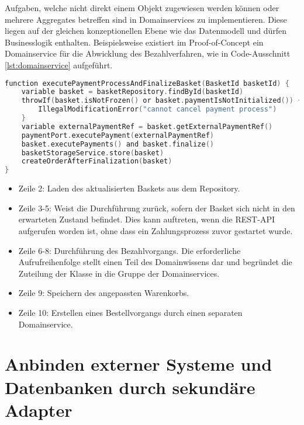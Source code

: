 Aufgaben, welche nicht direkt einem Objekt zugewiesen werden können oder mehrere Aggregates betreffen sind in Domainservices zu implementieren. Diese liegen auf der gleichen konzeptionellen Ebene wie das Datenmodell und dürfen Businesslogik enthalten. Beispielsweise existiert im Proof-of-Concept ein Domainservice für die Abwicklung des Bezahlverfahren, wie in Code-Ausschnitt \ref{lst:domainservice} aufgeführt. 

\begin{minipage}{\linewidth} %
	\begin{lstlisting}[caption={Ausführung des Bezahlvorgangs in einem Domainservice}, label={lst:domainservice}, language=Kotlin]
function executePaymentProcessAndFinalizeBasket(BasketId basketId) {
	variable basket = basketRepository.findById(basketId)
	throwIf(basket.isNotFrozen() or basket.paymentIsNotInitialized()) {
		IllegalModificationError("cannot cancel payment process")
	}
	variable externalPaymentRef = basket.getExternalPaymentRef()
	paymentPort.executePayment(externalPaymentRef)
	basket.executePayments() and basket.finalize()
	basketStorageService.store(basket)
	createOrderAfterFinalization(basket)
}
	\end{lstlisting}
\end{minipage}

\begin{itemize}[noitemsep,nolistsep]
	\item Zeile 2: Laden des aktualisierten Baskets aus dem Repository.
	\item Zeile 3-5: Weist die Durchführung zurück, sofern der Basket sich nicht in den erwarteten Zustand befindet. Dies kann auftreten, wenn die REST-API aufgerufen worden ist, ohne dass ein Zahlungsprozess zuvor gestartet wurde.
	\item Zeile 6-8: Durchführung des Bezahlvorgangs. Die erforderliche Aufrufreihenfolge stellt einen Teil des Domainwissens dar und begründet die Zuteilung der Klasse in die Gruppe der Domainservices.
	\item Zeile 9: Speichern des angepassten Warenkorbs.
	\item Zeile 10: Erstellen eines Bestellvorgangs durch einen separaten Domainservice.
\end{itemize}

\section{Anbinden externer Systeme und Datenbanken durch sekundäre Adapter}

